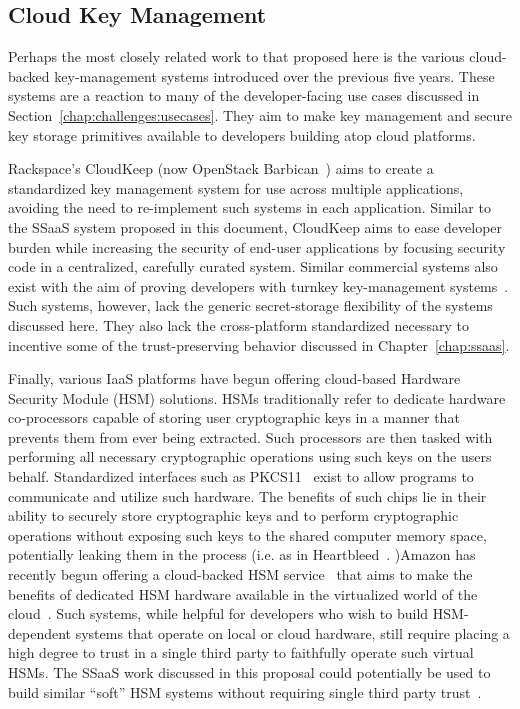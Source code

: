 \subsection{Cloud Key Management}

Perhaps the most closely related work to that proposed here is the
various cloud-backed key-management systems introduced over the
previous five years. These systems are a reaction to many of the
developer-facing use cases discussed in
Section~\ref{chap:challenges:usecases}. They aim to make key
management and secure key storage primitives available to developers
building atop cloud platforms.

Rackspace's CloudKeep\cite{cloudkeep-presentation, cloudkeep} (now
OpenStack Barbican~\cite{openstack-barbican}) aims to create a
standardized key management system for use across multiple
applications, avoiding the need to re-implement such systems in each
application. Similar to the SSaaS system proposed in this document,
CloudKeep aims to ease developer burden while increasing the security
of end-user applications by focusing security code in a centralized,
carefully curated system. Similar commercial systems also exist with
the aim of proving developers with turnkey key-management
systems~\cite{gazzang, porticor, rosen2012}. Such systems, however,
lack the generic secret-storage flexibility of the systems discussed
here. They also lack the cross-platform standardized necessary to
incentive some of the trust-preserving behavior discussed in
Chapter~\ref{chap:ssaas}.

Finally, various IaaS platforms have begun offering cloud-based
Hardware Security Module (HSM) solutions. HSMs traditionally refer to
dedicate hardware co-processors capable of storing user cryptographic
keys in a manner that prevents them from ever being extracted. Such
processors are then tasked with performing all necessary cryptographic
operations using such keys on the users behalf. Standardized
interfaces such as PKCS11~\cite{pcks11-standard} exist to allow
programs to communicate and utilize such hardware. The benefits of
such chips lie in their ability to securely store cryptographic keys
and to perform cryptographic operations without exposing such keys to
the shared computer memory space, potentially leaking them in the
process (i.e. as in Heartbleed~\cite{heartbleed}. )Amazon has recently
begun offering a cloud-backed HSM service~\cite{lorier-pkcs11} that
aims to make the benefits of dedicated HSM hardware available in the
virtualized world of the cloud~\cite{amazon-hsm}. Such systems, while
helpful for developers who wish to build HSM-dependent systems that
operate on local or cloud hardware, still require placing a high
degree to trust in a single third party to faithfully operate such
virtual HSMs. The SSaaS work discussed in this proposal could
potentially be used to build similar ``soft'' HSM systems without
requiring single third party trust~\cite{lorier-pkcs11}.

